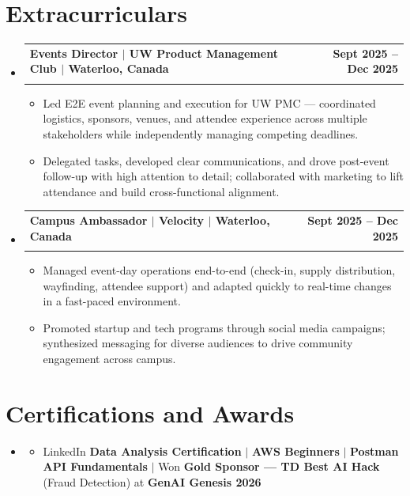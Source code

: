 \documentclass[letterpaper,10pt]{article}
\makeatletter
\newcommand{\resumeItem}[1]{
  \item\small{
    {#1 \vspace{-1pt}}
  }
}
\newcommand{\resumeSubheading}[4]{
  \vspace{-1pt}\item
    \begin{tabular*}{1.0\textwidth}[t]{l@{\extracolsep{\fill}}r}
      \textbf{#1} & \textbf{\small #2} \\
      \textit{\small#3} & \textit{\small #4} \\[-2pt]
    \end{tabular*}\vspace{-7pt}
}
\newcommand{\resumeSubHeadingListStart}{\begin{itemize}[leftmargin=0.0in, label={}]}
\newcommand{\resumeSubHeadingListEnd}{\end{itemize}}
\newcommand{\resumeItemListStart}{\begin{itemize}[leftmargin=0.15in]}
\newcommand{\resumeItemListEnd}{\end{itemize}\vspace{-4pt}}
\makeatother
\begin{document}
\section{Extracurriculars}
  \resumeSubHeadingListStart
    \resumeSubheading
      {Events Director $|$ UW Product Management Club $|$ Waterloo, Canada}{Sept 2025 -- Dec 2025}
      {}{}
      \vspace{-13pt}
      \resumeItemListStart
      \vspace{-2pt}
        \resumeItem{Led E2E event planning and execution for UW PMC --- coordinated logistics, sponsors, venues, and attendee experience across multiple stakeholders while independently managing competing deadlines.}
        \vspace{-2pt}
        \resumeItem{Delegated tasks, developed clear communications, and drove post-event follow-up with high attention to detail; collaborated with marketing to lift attendance and build cross-functional alignment.}
      \resumeItemListEnd
      \vspace{-5pt}
    \resumeSubheading
      {Campus Ambassador $|$ Velocity $|$ Waterloo, Canada}{Sept 2025 -- Dec 2025}
      {}{}
      \vspace{-13pt}
      \resumeItemListStart
      \vspace{-2pt}
        \resumeItem{Managed event-day operations end-to-end (check-in, supply distribution, wayfinding, attendee support) and adapted quickly to real-time changes in a fast-paced environment.}
        \vspace{-2pt}
        \resumeItem{Promoted startup and tech programs through social media campaigns; synthesized messaging for diverse audiences to drive community engagement across campus.}
      \resumeItemListEnd
      \vspace{-2pt}
  \resumeSubHeadingListEnd
\vspace{-13pt}

\section{Certifications and Awards}
    \resumeSubHeadingListStart
      \item[]
          \resumeItemListStart
            \resumeItem{LinkedIn \textbf{Data Analysis Certification} $|$ \textbf{AWS Beginners} $|$ \textbf{Postman API Fundamentals} $|$ Won \textbf{Gold Sponsor --- TD Best AI Hack} (Fraud Detection) at \textbf{GenAI Genesis 2026}}
          \resumeItemListEnd
          \vspace{-8pt}
   \resumeSubHeadingListEnd
\end{document}
